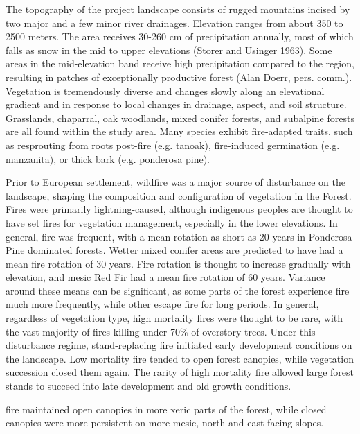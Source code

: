 The topography of the project landscape consists of rugged mountains incised by two major and a few minor river drainages. Elevation ranges from about 350 to 2500 meters. The area receives 30-260 cm of precipitation annually, most of which falls as snow in the mid to upper elevations (Storer and Usinger 1963). Some areas in the mid-elevation band receive high precipitation compared to the region, resulting in patches of exceptionally productive forest (Alan Doerr, pers. comm.). Vegetation is tremendously diverse and changes slowly along an elevational gradient and in response to local changes in drainage, aspect, and soil structure. Grasslands, chaparral, oak woodlands, mixed conifer forests, and subalpine forests are all found within the study area. Many species exhibit fire-adapted traits, such as resprouting from roots post-fire (e.g. tanoak), fire-induced germination (e.g. manzanita), or thick bark (e.g. ponderosa pine). 

Prior to European settlement, wildfire was a major source of disturbance on the landscape, shaping the composition and configuration of vegetation in the Forest. Fires were primarily lightning-caused, although indigenous peoples are thought to have set fires for vegetation management, especially in the lower elevations. In general, fire was frequent, with a mean rotation as short as 20 years in Ponderosa Pine dominated forests. Wetter mixed conifer areas are predicted to have had a mean fire rotation of 30 years. Fire rotation is thought to increase gradually with elevation, and mesic Red Fir had a mean fire rotation of 60 years. Variance around these means can be significant, as some parts of the forest experience fire much more frequently, while other escape fire for long periods. In general, regardless of vegetation type, high mortality fires were thought to be rare, with the vast majority of fires killing under 70\% of overstory trees. Under this disturbance regime, stand-replacing fire initiated early development conditions on the landscape. Low mortality fire tended to open forest canopies, while vegetation succession closed them again. The rarity of high mortality fire allowed large forest stands to succeed into late development and old growth conditions.

fire maintained open canopies in more xeric parts of the forest, while closed canopies were more persistent on more mesic, north and east-facing slopes. 

